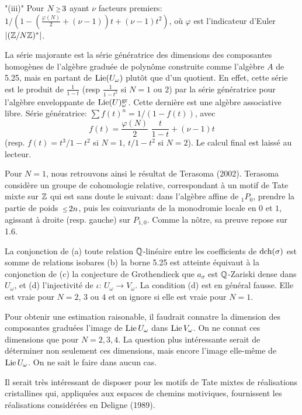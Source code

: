 \item"{\sans (iii)}"
Pour $N\Ge 3$ ayant $\nu$ facteurs premiers:
$1/\left(1-\left(\frac{\varphi(N)}{2}+(\nu-1)\right)
t+(\nu-1)t^2\right)$, o\`u $\varphi$
est l'indicateur d'Euler
$\vert({\Bbb Z}/N{\Bbb Z})^*\vert$.
\endroster
\endproclaim

La s\'erie majorante est la s\'erie
g\'en\'eratrice des dimensions des composantes
homog\`enes de l'alg\`ebre gradu\'ee de
polyn\^{o}me construite comme l'alg\`ebre $A$
de 5.25, mais en partant de $\text{\rm Lie}(U_\omega)$
plut\^{o}t que d'un quotient.
En effet, cette s\'erie est le produit de
$\frac{1}{1-t}$ (resp $\frac{1}{1-t^2}$ si
$N=1$ ou $2$) par la s\'erie g\'en\'eratrice
pour l'alg\`ebre enveloppante de
$\text{\rm Lie}(U)_\omega^{\text{\rm gr}}$.
Cette derni\`ere est une alg\`ebre associative
libre.
S\'erie g\'en\'eratrice: $\sum
f(t)^n=1/(1-f(t))$, avec
$$
f(t)=\frac{\varphi(N)}{2}\,\,\frac{t}{1-t}+(\nu-1)t
$$
(resp. $f(t)=t^3/1-t^2$ si $N=1$, $t/1-t^2$ si
$N=2$).
Le calcul final est laiss\'e au lecteur.
\enddemo

\remark{}\enspace
Pour $N=1$, nous retrouvons ainsi le
r\'esultat de Terasoma (2002).
Terasoma consid\`ere un groupe de cohomologie
relative, correspondant \`a un motif de Tate
mixte sur ${\Bbb Z}$ qui est sans doute le
suivant: dans l'alg\`ebre affine de ${}_1P_0$,
prendre la partie de poids $\Le 2n$, puis les
coinvariants de la monodromie locale en $0$
et $1$, agissant \`a droite (resp. gauche) sur
$P_{1,0}$.
Comme la n\^{o}tre, sa preuve repose sur 1.6.
\endremark

\endsubhead
La conjonction de (a) toute relation
${\Bbb Q}$-lin\'eaire entre les coefficients de
$\text{\rm dch}(\sigma)$ est somme de relations isobares
(b) la borne 5.25 est atteinte \'equivaut \`a
la conjonction de (c) la conjecture de
Grothendieck que $a_\sigma$ est ${\Bbb Q}$-Zariski
dense dans $U_\omega$, et (d) l'injectivit\'e
de $\iota\colon\, U_\omega\to V_\omega$.
La condition (d) est en g\'en\'eral fausse.
Elle est vraie pour $N=2$, $3$ ou $4$ et on
ignore si elle est vraie pour $N=1$.

Pour obtenir une estimation raisonable, il
faudrait conna{\hati}tre la dimension des
composantes gradu\'ees l'image de $\text{\rm Lie}\,U_\omega$
dans $\text{\rm Lie}\,V_\omega$.
On ne conna{\hati}t ces dimensions que pour
$N=2,3,4$.
La question plus int\'eressante serait de
d\'eterminer non seulement ces dimensions, mais
encore l'image elle-m\^{e}me de $\text{\rm Lie}\,U_\omega$.
On ne sait le faire dans aucun cas.

\endsubhead
Il serait tr\`es int\'eressant de disposer
pour les motifs de Tate mixtes de
r\'ealisations cristallines qui, appliqu\'ees
aux espaces de chemins motiviques, fournissent
les r\'ealisations consid\'er\'ees en Deligne
(1989).

